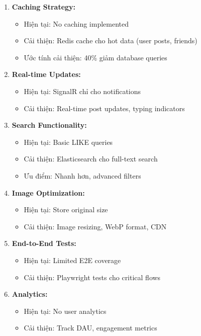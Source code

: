 \begin{enumerate}
    \item \textbf{Caching Strategy:} 
    \begin{itemize}
        \item Hiện tại: No caching implemented
        \item Cải thiện: Redis cache cho hot data (user posts, friends)
        \item Ước tính cải thiện: 40\% giảm database queries
    \end{itemize}

    \item \textbf{Real-time Updates:}
    \begin{itemize}
        \item Hiện tại: SignalR chỉ cho notifications
        \item Cải thiện: Real-time post updates, typing indicators
    \end{itemize}

    \item \textbf{Search Functionality:}
    \begin{itemize}
        \item Hiện tại: Basic LIKE queries
        \item Cải thiện: Elasticsearch cho full-text search
        \item Ưu điểm: Nhanh hơn, advanced filters
    \end{itemize}

    \item \textbf{Image Optimization:}
    \begin{itemize}
        \item Hiện tại: Store original size
        \item Cải thiện: Image resizing, WebP format, CDN
    \end{itemize}

    \item \textbf{End-to-End Tests:}
    \begin{itemize}
        \item Hiện tại: Limited E2E coverage
        \item Cải thiện: Playwright tests cho critical flows
    \end{itemize}

    \item \textbf{Analytics:}
    \begin{itemize}
        \item Hiện tại: No user analytics
        \item Cải thiện: Track DAU, engagement metrics
    \end{itemize}
\end{enumerate}

